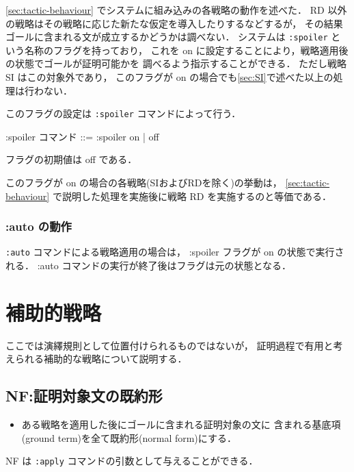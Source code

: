 \documentclass[a4paper,oneside,10pt,here]{memoir}
\newenvironment{vvtm}%
{\parskip=0pt\lineskip=0pt\begin{center}\begin{minipage}{0.8\textwidth}\begin{snugshade}}%
  {\end{snugshade}\end{minipage}\end{center}}
\begin{document}
\ref{sec:tactic-behaviour} でシステムに組み込みの各戦略の動作を述べた．
RD 以外の戦略はその戦略に応じた新たな仮定を導入したりするなどするが，
その結果ゴールに含まれる文が成立するかどうかは調べない．
システムは \verb|:spoiler| という名称のフラグを持っており，
これを on に設定することにより，戦略適用後の状態でゴールが証明可能かを%
調べるよう指示することができる．
ただし戦略 SI はこの対象外であり，
このフラグが on の場合でも\ref{sec:SI}で述べた以上の処理は行わない．

このフラグの設定は \verb|:spoiler| コマンドによって行う．
  \begin{vvtm}
    \begin{simplev}
  :spoiler コマンド ::= :spoiler { on | off }
    \end{simplev}
  \end{vvtm}

フラグの初期値は off である．

このフラグが on の場合の各戦略(SIおよびRDを除く)の挙動は，%
\ref{sec:tactic-behaviour} で説明した処理を実施後に戦略 RD を実施するのと等価である．

\subsubsection{:auto の動作}\label{sec:auto-and-spoiler}
\texttt{:auto} コマンドによる戦略適用の場合は，
:spoiler フラグが on の状態で実行される．
:auto コマンドの実行が終了後はフラグは元の状態となる．

\section{補助的戦略}\label{sec:suppliment}
ここでは演繹規則として位置付けられるものではないが，
証明過程で有用と考えられる補助的な戦略について説明する．

\subsection{NF:証明対象文の既約形}\label{sec:normal-form}

\begin{itemize}
\item ある戦略を適用した後にゴールに含まれる証明対象の文に
  含まれる基底項(ground term)を全て既約形(normal form)にする．
\end{itemize}
NF は \verb|:apply| コマンドの引数として与えることができる．

\end{document}

